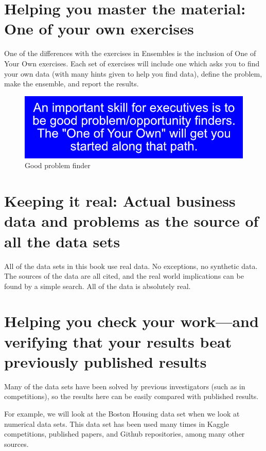 \documentclass[
]{book}
\begin{document}
\section{Helping you master the material: One of your own exercises}\label{helping-you-master-the-material-one-of-your-own-exercises}

One of the differences with the exercises in Ensembles is the inclusion of One of Your Own exercises. Each set of exercises will include one which asks you to find your own data (with many hints given to help you find data), define the problem, make the ensemble, and report the results.

\begin{figure}
\centering
\includegraphics{_book/images/Good_problem_finder.jpg}
\caption{Good problem finder}
\end{figure}

\section{Keeping it real: Actual business data and problems as the source of all the data sets}\label{keeping-it-real-actual-business-data-and-problems-as-the-source-of-all-the-data-sets}

All of the data sets in this book use real data. No exceptions, no synthetic data. The sources of the data are all cited, and the real world implications can be found by a simple search. All of the data is absolutely real.

\section{Helping you check your work---and verifying that your results beat previously published results}\label{helping-you-check-your-workand-verifying-that-your-results-beat-previously-published-results}

Many of the data sets have been solved by previous investigators (such as in competitions), so the results here can be easily compared with published results.

For example, we will look at the Boston Housing data set when we look at numerical data sets. This data set has been used many times in Kaggle competitions, published papers, and Github repositories, among many other sources.
\end{document}
